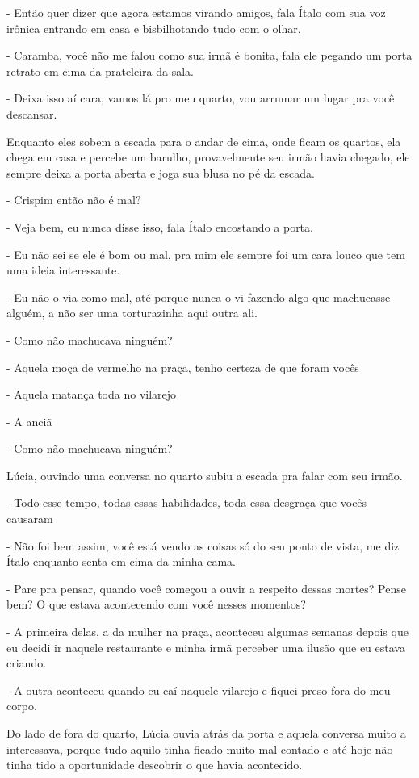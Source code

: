 - Então quer dizer que agora estamos virando amigos, fala Ítalo com sua voz irônica entrando em casa e bisbilhotando tudo com o olhar.

- Caramba, você não me falou como sua irmã é bonita, fala ele pegando um porta retrato em cima da prateleira da sala.

- Deixa isso aí cara, vamos lá pro meu quarto, vou arrumar um lugar pra você descansar.

Enquanto eles sobem a escada para o andar de cima, onde ficam os quartos, ela chega em casa e percebe um barulho, provavelmente seu irmão havia chegado, ele sempre deixa a porta aberta e joga sua blusa no pé da escada.

- Crispim então não é mal?

- Veja bem, eu nunca disse isso, fala Ítalo encostando a porta.

- Eu não sei se ele é bom ou mal, pra mim ele sempre foi um cara louco que tem uma ideia interessante.

- Eu não o via como mal, até porque nunca o vi fazendo algo que machucasse alguém, a não ser uma torturazinha aqui outra ali.

- Como não machucava ninguém?

- Aquela moça de vermelho na praça, tenho certeza de que foram vocês

- Aquela matança toda no vilarejo

- A anciã

- Como não machucava ninguém?

Lúcia, ouvindo uma conversa no quarto subiu a escada pra falar com seu irmão.

- Todo esse tempo, todas essas habilidades, toda essa desgraça que vocês causaram

- Não foi bem assim, você está vendo as coisas só do seu ponto de vista, me diz Ítalo enquanto senta em cima da minha cama.

- Pare pra pensar, quando você começou a ouvir a respeito dessas mortes? Pense bem? O que estava acontecendo com você nesses momentos?

- A primeira delas, a da mulher na praça, aconteceu algumas semanas depois que eu decidi ir naquele restaurante e minha irmã perceber uma ilusão que eu estava criando.

- A outra aconteceu quando eu caí naquele vilarejo e fiquei preso fora do meu corpo.

Do lado de fora do quarto, Lúcia ouvia atrás da porta e aquela conversa muito a interessava, porque tudo aquilo tinha ficado muito mal contado e até hoje não tinha tido a oportunidade descobrir o que havia acontecido.

